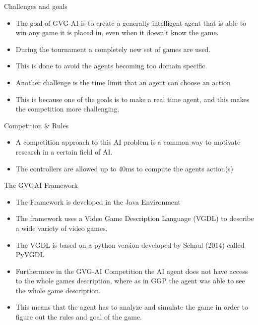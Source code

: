 \documentclass{beamer}
\begin{document}
\begin{frame}{Challenges and goals}		
			\begin{itemize}
			\item The goal of GVG-AI is to create a generally intelligent agent that is able to win any game it is placed in, even when it doesn't know the game. \pause
			\item During the tournament a completely new set of games are used. \pause
			\item This is done to avoid the agents becoming too domain specific. \pause
			\item Another challenge is the time limit that an agent can choose an action \pause
			\item This is because one of the goals is to make a real time agent, and this makes the competition more challenging. \pause
		\end{itemize}
\end{frame}
	
\begin{frame}{Competition \& Rules}		
			\begin{itemize}
			\item A competition approach to this AI problem is a common way to motivate research in a certain field of AI. \pause
			\item The controllers are allowed up to 40ms to compute the agents action(s)  \pause
		\end{itemize}
\end{frame}


\begin{frame}{The GVGAI Framework}		
			\begin{itemize}
			\item The Framework is developed in the Java Environment \pause
			\item The framework uses a Video Game Description Language (VGDL) to describe a wide variety of video games. \pause
			\item The VGDL is based on a python version developed by Schaul (2014) called PyVGDL \pause
			\item  Furthermore in the GVG-AI Competition the AI agent does not have access to the whole games description, where as in GGP the agent was able to see the whole game description. \pause
			\item  This means that the agent has to analyze and simulate the game in order to figure out the rules and goal of the game. \pause
		\end{itemize}
\end{frame}
\end{document}
